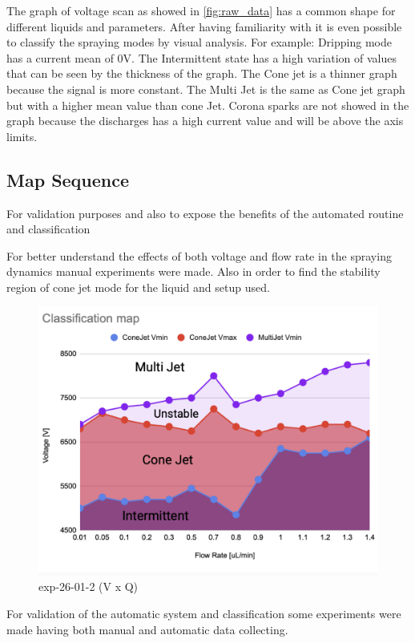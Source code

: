 The graph of voltage scan as showed in \ref{fig:raw_data} has a common shape for different liquids and parameters. After having familiarity with it is even possible to classify the spraying modes by visual analysis. For example: 
Dripping mode has a current mean of 0V. The Intermittent state has a high variation of values that can be seen by the thickness of the graph. The Cone jet is a thinner graph because the signal is more constant. The Multi Jet is the same as Cone jet graph but with a higher mean value than cone Jet. Corona sparks are not showed in the graph because the discharges has a high current value and will be above the axis limits.



\subsection{Map Sequence}
\label{subsec:map_results}

For validation purposes and also to expose the benefits of the automated routine and classification 




    For better understand the effects of both voltage and flow rate in the spraying dynamics manual experiments were made.
    Also in order to find the stability region of cone jet mode for the liquid and setup used.

    \begin{figure}[H]
        \center
        \includegraphics[width=12cm]{Figuras/regions.png}
        \caption{ exp-26-01-2 (V x Q)}
    \end{figure}


    For validation of the automatic system and classification some experiments were made having both manual and automatic data collecting.



